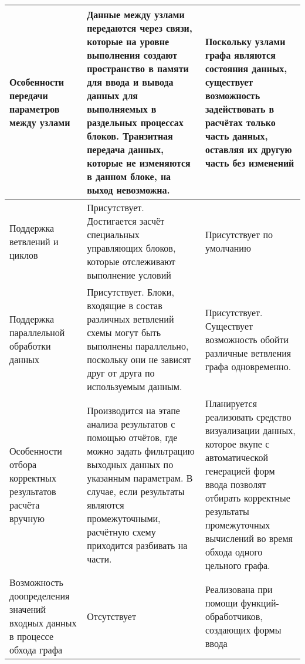 \begin{longtable}{|p{3.5cm}|p{6.625cm}|p{6.625cm}|}
    \hline
    Особенности передачи параметров между узлами & Данные между узлами передаются через связи, которые на уровне выполнения создают пространство в памяти для ввода и вывода данных для выполняемых в раздельных процессах блоков.  Транзитная передача данных, которые не изменяются в данном блоке, на выход невозможна. & Поскольку узлами графа являются состояния данных, существует возможность задействовать в расчётах только часть данных, оставляя их другую часть без изменений \\
    \hline
    Поддержка ветвлений и циклов & Присутствует. Достигается засчёт специальных управляющих блоков, которые отслеживают выполнение условий & Присутствует по умолчанию\\
    \hline
    Поддержка параллельной обработки данных & Присутствует. Блоки, входящие в состав различных ветвлений схемы могут быть выполнены параллельно, поскольку они не зависят друг от друга по используемым данным. & Присутствует. Существует возможность обойти различные ветвления графа одновременно.\\
    \hline
    Особенности отбора корректных результатов расчёта вручную & Производится на этапе анализа результатов с помощью отчётов, где можно задать фильтрацию выходных данных по указанным параметрам. В случае, если результаты являются промежуточными, расчётную схему приходится разбивать на части. & Планируется реализовать средство визуализации данных, которое вкупе с автоматической генерацией форм ввода позволят отбирать корректные результаты промежуточных вычислений во время обхода одного цельного графа. \\
    \hline
    Возможность доопределения значений входных данных в процессе обхода графа & Отсутствует & Реализована при помощи функций-обработчиков, создающих формы ввода \\
    \hline
\end{longtable}
